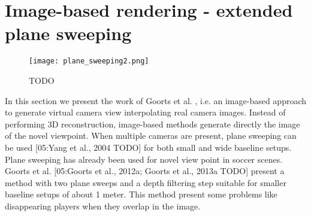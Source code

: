 \section{Image-based rendering - extended plane sweeping}


\begin{figure*}[htbp]
\centerline{\texttt{[image: plane\_sweeping2.png]}}
\caption{TODO}
\label{fig:plane_sweeping2}
\end{figure*}

In this section we present the work of Goorts et al. \cite{05_plane_sweeping}, i.e. an image-based approach to generate 
virtual camera view interpolating real camera images.
Instead of performing 3D reconstruction, image-based methods generate directly the image of the novel viewpoint.
When multiple cameras are present, plane sweeping can be used [05:Yang et al., 2004 TODO] for both small and wide 
baseline setups.
Plane sweeping has already been used for novel view point in soccer scenes. Goorts et al. [05:Goorts
et al., 2012a; Goorts et al., 2013a TODO] present a method
with two plane sweeps and a depth filtering step suitable for smaller baseline 
setups of about 1 meter. 
This method present some problems like disappearing players
when they overlap in the image.

